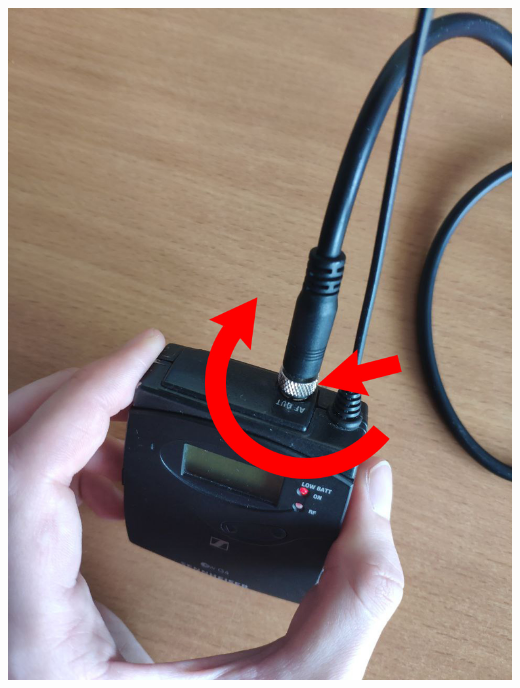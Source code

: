 \begin{enumerate}
\begin{enumerate}
\begin{minipage}[c]{0.29\textwidth}
                  \includegraphics[width=\textwidth]{Images/PortableCamera/micro/step10.3-2-jack-in-micro.jpg}
                \end{minipage}
                \hfill
                \begin{minipage}[c]{0.29\textwidth}

\end{minipage}
\end{enumerate}
\end{enumerate}
